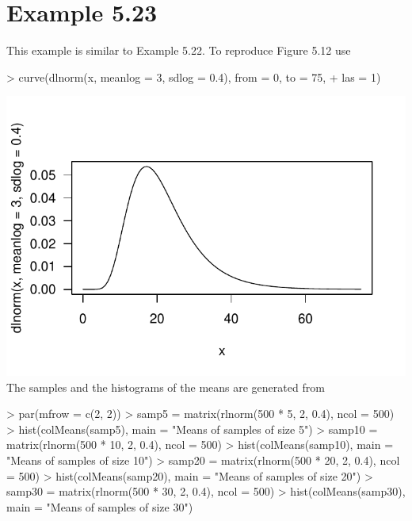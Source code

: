 \documentclass{book}
\begin{document}
\section{Example 5.23}
\label{sec:xmp0523}

This example is similar to Example 5.22.  To reproduce Figure 5.12 use
\begin{Schunk}
\begin{Sinput}
> curve(dlnorm(x, meanlog = 3, sdlog = 0.4), from = 0, to = 75, 
+     las = 1)
\end{Sinput}
\end{Schunk}
\includegraphics{Devore6-xmp0523a}
The samples and the histograms of the means are generated from
\begin{Schunk}
\begin{Sinput}
> par(mfrow = c(2, 2))
> samp5 = matrix(rlnorm(500 * 5, 2, 0.4), ncol = 500)
> hist(colMeans(samp5), main = "Means of samples of size 5")
> samp10 = matrix(rlnorm(500 * 10, 2, 0.4), ncol = 500)
> hist(colMeans(samp10), main = "Means of samples of size 10")
> samp20 = matrix(rlnorm(500 * 20, 2, 0.4), ncol = 500)
> hist(colMeans(samp20), main = "Means of samples of size 20")
> samp30 = matrix(rlnorm(500 * 30, 2, 0.4), ncol = 500)
> hist(colMeans(samp30), main = "Means of samples of size 30")
\end{Sinput}
\end{Schunk}
\end{document}
